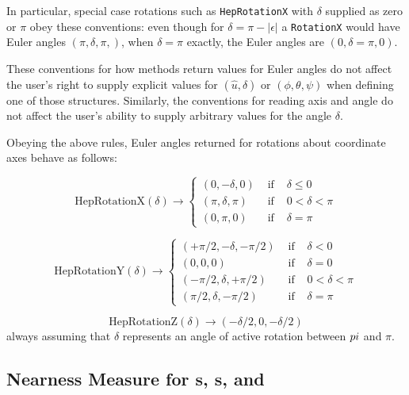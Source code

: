 \noindent
In particular, special case rotations such as
{\tt HepRotationX} with $\delta$ supplied as zero or $\pi$
obey these conventions:  even though for $\delta = \pi - |\epsilon|$
a {\tt RotationX} would have Euler angles $( \pi, \delta, \pi, )$,
when $\delta = \pi$ exactly, the Euler angles are $(0, \delta=\pi, 0)$.

These conventions for how methods return values for Euler angles
do not affect the user's right to supply explicit values for
$ ( \hat{u}, \delta) $ or $ ( \phi, \theta, \psi ) $ when defining one of those
structures.
Similarly, the conventions for reading axis and angle do not affect the
user's ability to supply arbitrary values for the angle $\delta$.

Obeying the above rules, Euler angles returned for
rotations about coordinate axes behave as follows:

\begin{equation}
\mbox{HepRotationX}(\delta) \longrightarrow
\left\{
\begin{array}{ccc}
( 0, -\delta, 0 ) & \mbox{ if } & \delta \leq 0 \\
( \pi, \delta, \pi ) & \mbox{ if } & 0 < \delta < \pi \\
( 0, \pi, 0 ) & \mbox{ if } & \delta = \pi
\end{array}
\right.
	\label{eq:rotXconv}
\end{equation}

\begin{equation}
\mbox{HepRotationY}(\delta) \longrightarrow
\left\{
\begin{array}{ccc}
( +\pi/2, -\delta, -\pi/2 ) & \mbox{ if } & \delta <  0 \\
( 0, 0, 0) & \mbox{ if } & \delta = 0 \\
( -\pi/2, \delta, +\pi/2 ) & \mbox{ if } & 0 <  \delta < \pi \\
( \pi/2, \delta, -\pi/2 ) & \mbox{ if } & \delta = \pi
\end{array}
\right.
	\label{eq:rotYconv}
\end{equation}

\begin{equation}
\mbox{HepRotationZ}(\delta) \longrightarrow ( -\delta/2, 0, -\delta/2 )
	\label{eq:rotZconv}
\end{equation}
\noindent always assuming that $\delta$ represents an angle of active rotation
between $\-pi$ and $\pi$.

\subsection{Nearness Measure for \protect\Ro s, \protect\Ax s, and \protect\Es\ }

